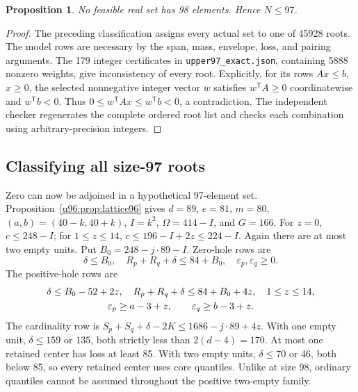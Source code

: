 \documentclass[11pt,a4paper]{article}
\newtheorem{proposition}[theorem]{Proposition}
\theoremstyle{remark}
\begin{document}
\begin{proposition}\label{u96:prop:exclude98}
No feasible real set has 98 elements. Hence $N\leq97$.
\end{proposition}
\begin{proof}
The preceding classification assigns every actual set to one of 45928
roots. The model rows are necessary by the span, mass, envelope, loss,
and pairing arguments. The 179 integer certificates in
\texttt{upper97\_exact.json}, containing 5888 nonzero weights, give
inconsistency of every root. Explicitly, for its rows $Ax\leq b$, $x\geq0$,
the selected nonnegative integer vector $w$ satisfies
$w^{\mathsf T}A\geq0$ coordinatewise and $w^{\mathsf T}b<0$.
Thus $0\leq w^{\mathsf T}Ax\leq w^{\mathsf T}b<0$, a contradiction.
The independent checker regenerates the complete ordered root list and
checks each combination using arbitrary-precision integers.
\end{proof}

\subsection{Classifying all size-97 roots}
Zero can now be adjoined in a hypothetical 97-element set.
Proposition~\ref{u96:prop:lattice96} gives
$d=89$, $e=81$, $m=80$, $(a,b)=(40-k,40+k)$,
$I=k^2$, $\Omega=414-I$, and $G=166$.
For $z=0$, $c\leq248-I$; for $1\leq z\leq14$,
$c\leq196-I+2z\leq224-I$. Again there are at most two empty units.
Put $B_0=248-j\cdot89-I$. Zero-hole rows are
\[
 \delta\leq B_0,\quad R_p+R_q+\delta\leq84+B_0,
 \quad \varepsilon_p,\varepsilon_q\geq0.
\]
The positive-hole rows are
\begin{gather}
 \delta\leq B_0-52+2z,\quad R_p+R_q+\delta\leq84+B_0+4z,
 \quad1\leq z\leq14,\notag\\
 \varepsilon_p\geq a-3+z,\qquad
 \varepsilon_q\geq b-3+z.\label{u96:eq:low97}
\end{gather}
The cardinality row is
$S_p+S_q+\delta-2K\leq1686-j\cdot89+4z$.
With one empty unit, $\delta\leq159$ or $135$, both strictly less than
$2(d-4)=170$. At most one retained center has loss at least 85.
With two empty units, $\delta\leq70$ or $46$, both below 85, so every
retained center uses core quantiles. Unlike at size 98, ordinary
quantiles cannot be assumed throughout the positive two-empty family.
\end{document}
